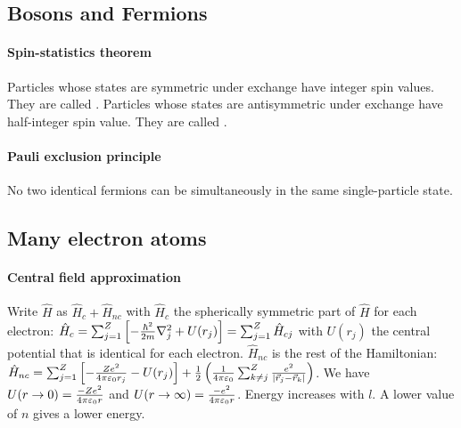 
\subsection{Bosons and Fermions}

\paragraph{Spin-statistics theorem}
Particles whose states are symmetric under exchange have integer spin values.
They are called . Particles whose states are antisymmetric under
exchange have half-integer spin value. They are called .

\paragraph{Pauli exclusion principle}
No two identical fermions can be simultaneously in the same single-particle state.


\subsection{Many electron atoms}

\paragraph{Central field approximation}
Write $\hat{H}$ as $\hat{H}_c + \hat{H}_{nc}$ with $\hat{H}_c$ the spherically
symmetric part of $\hat{H}$ for each electron:
$\hat{H}_c = \sum_{j=1}^Z \left[ - \frac{\hbar^2}{2m} \nabla_j^2 + U(r_j) \right]
= \sum_{j=1}^Z \hat{H}_{cj}$ with $U(r_j)$ the central potential that is identical
for each electron. $\hat{H}_{nc}$ is the rest of the Hamiltonian:
$\hat{H}_{nc} = \sum_{j=1}^Z \left[ - \frac{Z e^2}{4 \pi \varepsilon_0 r_j} - U(r_j) \right]
+ \frac{1}{2} \left( \frac{1}{4 \pi \varepsilon_0} \sum_{k \neq j}^Z \frac{e^2}{\left\vert \vec{r}_j - \vec{r}_k \right\vert} \right)$.
We have $U(r \rightarrow 0) = \frac{- Z e^2}{4 \pi \varepsilon_0 r}$ and
$U(r \rightarrow \infty) = \frac{-e^2}{4 \pi \varepsilon_0 r}$.
Energy increases with $l$. A lower value of $n$ gives a lower energy.

